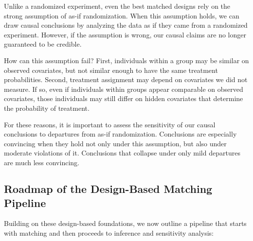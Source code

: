 \documentclass[
  12pt,
  leqno]{article}
\begin{document}
Unlike a randomized experiment, even the best matched designs rely on
the strong assumption of as-if randomization. When this assumption
holds, we can draw causal conclusions by analyzing the data as if they
came from a randomized experiment. However, if the assumption is wrong,
our causal claims are no longer guaranteed to be credible.

How can this assumption fail? First, individuals within a group may be
similar on observed covariates, but not similar enough to have the same
treatment probabilities. Second, treatment assignment may depend on
covariates we did not measure. If so, even if individuals within groups
appear comparable on observed covariates, those individuals may still
differ on hidden covariates that determine the probability of treatment.

For these reasons, it is important to assess the sensitivity of our
causal conclusions to departures from as-if randomization. Conclusions
are especially convincing when they hold not only under this assumption,
but also under moderate violations of it. Conclusions that collapse
under only mild departures are much less convincing.

\subsection{Roadmap of the Design-Based Matching
Pipeline}\label{roadmap-of-the-design-based-matching-pipeline}

Building on these design-based foundations, we now outline a pipeline
that starts with matching and then proceeds to inference and sensitivity
analysis:
\end{document}
